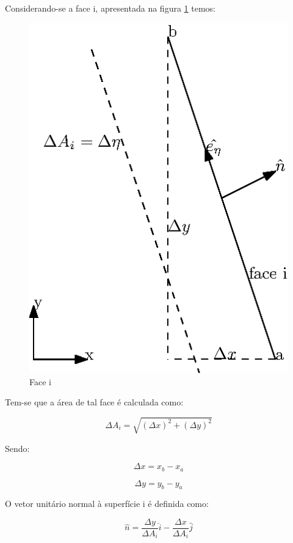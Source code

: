 Considerando-se a face i, apresentada na figura \ref{face-i} temos:

\begin{figure}[h]
    \centering
    \includegraphics{fig/face-i.eps}
    \caption{Face i}
    \label{face-i}
\end{figure}

Tem-se que a área de tal face é calculada como:

\begin{equation}
    \label{eq:6.11}
    \Delta A_i = \sqrt{(\Delta x)^2 + (\Delta y)^2}
\end{equation}

Sendo:

\begin{equation}
    \label{eq:6.12}
    \Delta x = x_b - x_a
\end{equation}

\begin{equation}
    \label{eq:6.13}
    \Delta y = y_b - y_a
\end{equation}

O vetor unitário normal à superfície i é definida como:

\begin{equation}
    \label{eq:6.14}
    \hat{n} = \frac{\Delta y}{\Delta A_i}\hat{i} - \frac{\Delta x}{\Delta A_i}\hat{j}
\end{equation}

